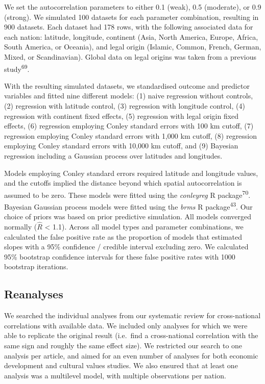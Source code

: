 \documentclass[
  english,
  man,floatsintext]{apa6}
\begin{document}
We set the autocorrelation parameters to either 0.1 (weak), 0.5 (moderate), or 0.9 (strong). We simulated 100 datasets for each parameter combination, resulting in 900 datasets. Each dataset had 178 rows, with the following associated data for each nation: latitude, longitude, continent (Asia, North America, Europe, Africa, South America, or Oceania), and legal origin (Islamic, Common, French, German, Mixed, or Scandinavian). Global data on legal origins was taken from a previous study\textsuperscript{69}.

With the resulting simulated datasets, we standardised outcome and predictor variables and fitted nine different models: (1) naive regression without controls, (2) regression with latitude control, (3) regression with longitude control, (4) regression with continent fixed effects, (5) regression with legal origin fixed effects, (6) regression employing Conley standard errors with 100 km cutoff, (7) regression employing Conley standard errors with 1,000 km cutoff, (8) regression employing Conley standard errors with 10,000 km cutoff, and (9) Bayesian regression including a Gaussian process over latitudes and longitudes.

Models employing Conley standard errors required latitude and longitude values, and the cutoffs implied the distance beyond which spatial autocorrelation is assumed to be zero. These models were fitted using the \emph{conleyreg} R package\textsuperscript{70}. Bayesian Gaussian process models were fitted using the \emph{brms} R package\textsuperscript{43}. Our choice of priors was based on prior predictive simulation. All models converged normally (\(\hat{R}\) \textless{} 1.1). Across all model types and parameter combinations, we calculated the false positive rate as the proportion of models that estimated slopes with a 95\% confidence / credible interval excluding zero. We calculated 95\% bootstrap confidence intervals for these false positive rates with 1000 bootstrap iterations.

\hypertarget{reanalyses}{%
\subsection{Reanalyses}\label{reanalyses}}

We searched the individual analyses from our systematic review for cross-national correlations with available data. We included only analyses for which we were able to replicate the original result (i.e.~find a cross-national correlation with the same sign and roughly the same effect size). We restricted our search to one analysis per article, and aimed for an even number of analyses for both economic development and cultural values studies. We also ensured that at least one analysis was a multilevel model, with multiple observations per nation.
\end{document}
